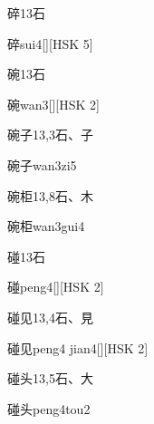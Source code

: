 \begin{entry}{碎}{13}{⽯}
  \begin{phonetics}{碎}{sui4}[][HSK 5]
  \end{phonetics}
\end{entry}

\begin{entry}{碗}{13}{⽯}
  \begin{phonetics}{碗}{wan3}[][HSK 2]
  \end{phonetics}
\end{entry}

\begin{entry}{碗子}{13,3}{⽯、⼦}
  \begin{phonetics}{碗子}{wan3zi5}
  \end{phonetics}
\end{entry}

\begin{entry}{碗柜}{13,8}{⽯、⽊}
  \begin{phonetics}{碗柜}{wan3gui4}
  \end{phonetics}
\end{entry}

\begin{entry}{碰}{13}{⽯}
  \begin{phonetics}{碰}{peng4}[][HSK 2]
  \end{phonetics}
\end{entry}

\begin{entry}{碰见}{13,4}{⽯、⾒}
  \begin{phonetics}{碰见}{peng4 jian4}[][HSK 2]
  \end{phonetics}
\end{entry}

\begin{entry}{碰头}{13,5}{⽯、⼤}
  \begin{phonetics}{碰头}{peng4tou2}
  \end{phonetics}
\end{entry}

